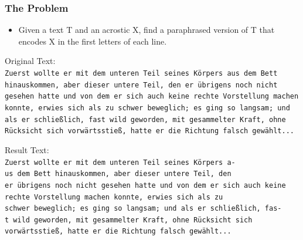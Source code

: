 \documentclass{beamer}
\begin{document}
\begin{frame}
\frametitle{The Problem}
\begin{itemize}
\item Given a text T and an acrostic X, find a paraphrased version of T that encodes X in the first letters of each line.
\end{itemize}
Original Text: \\
\texttt{\tiny Zuerst wollte er mit dem unteren Teil seines Körpers aus dem Bett \\
hinauskommen, aber dieser untere Teil, den er übrigens noch nicht \\
gesehen hatte und von dem er sich auch keine rechte Vorstellung machen \\
konnte, erwies sich als zu schwer beweglich; es ging so langsam; und \\
als er schließlich, fast wild geworden, mit gesammelter Kraft, ohne \\
Rücksicht sich vorwärtsstieß, hatte er die Richtung falsch gewählt...\\}

Result Text: \\

\texttt{\scriptsize{Z}\tiny uerst wollte er mit dem unteren Teil seines Körpers a-\\
\scriptsize{u}\tiny s dem Bett hinauskommen, aber dieser untere Teil, den\\
\scriptsize{e}\tiny r übrigens noch nicht gesehen hatte und von dem er sich auch keine\\
\scriptsize{r}\tiny echte Vorstellung machen konnte, erwies sich als zu\\
\scriptsize{s}\tiny chwer beweglich; es ging so langsam; und als er schließlich, fas-\\
\scriptsize{t}\tiny \ wild geworden, mit gesammelter Kraft, ohne Rücksicht sich\\
vorwärtsstieß, hatte er die Richtung falsch gewählt...\\}
\end{frame}
\end{document}

